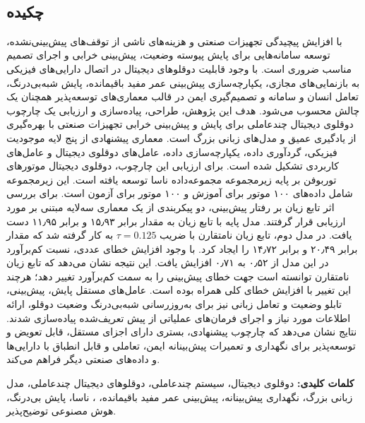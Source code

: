 
\setcounter{page}{1}
\thispagestyle{empty}

~\vfill

\subsection*{چکیده}
\begin{small}
\baselineskip=0.7cm

با افزایش پیچیدگی تجهیزات صنعتی و هزینه‌های ناشی از توقف‌های پیش‌بینی‌نشده، توسعه سامانه‌هایی برای پایش پیوسته وضعیت، پیش‌بینی خرابی و اجرای تصمیم مناسب ضروری است. با وجود قابلیت دوقلوهای دیجیتال در اتصال دارایی‌های فیزیکی به بازنمایی‌های مجازی، یکپارچه‌سازی پیش‌بینی عمر مفید باقیمانده، پایش شبه‌بی‌درنگ، تعامل انسان و سامانه و تصمیم‌گیری ایمن در قالب معماری‌های توسعه‌پذیر همچنان یک چالش محسوب می‌شود. هدف این پژوهش، طراحی، پیاده‌سازی و ارزیابی یک چارچوب دوقلوی دیجیتال چندعاملی برای پایش و پیش‌بینی خرابی تجهیزات صنعتی با بهره‌گیری از یادگیری عمیق و مدل‌های زبانی بزرگ است. معماری پیشنهادی از پنج لایه موجودیت فیزیکی، گردآوری داده، یکپارچه‌سازی داده، عامل‌های دوقلوی دیجیتال و عامل‌های کاربردی تشکیل شده است. برای ارزیابی این چارچوب، دوقلوی دیجیتال موتورهای توربوفن بر پایه زیرمجموعه  مجموعه‌داده
ناسا توسعه یافته است. این زیرمجموعه شامل داده‌های ۱۰۰ موتور برای آموزش و ۱۰۰ موتور برای آزمون است. 
برای بررسی اثر تابع زیان بر رفتار
پیش‌بینی، دو پیکربندی از یک
معماری سه‌لایه مبتنی بر
 مورد ارزیابی قرار
گرفتند. مدل پایه با تابع
زیان  به مقدار
 برابر ۱۵٫۹۳
و  برابر ۱۱٫۹۵
دست یافت. در مدل دوم،
تابع زیان نامتقارن
 با ضریب
$\tau=0.125$ به کار
گرفته شد که مقدار
 برابر ۲۰٫۴۹
و  برابر ۱۴٫۷۲
را ایجاد کرد. با وجود
افزایش خطای عددی،
نسبت کم‌برآورد در این
مدل از ۰٫۵۲ به
۰٫۷۱ افزایش یافت.
این نتیجه نشان می‌دهد
که تابع زیان نامتقارن
توانسته است جهت خطای
پیش‌بینی را به سمت
کم‌برآورد تغییر دهد؛
هرچند این تغییر با
افزایش خطای کلی همراه
بوده است.
عامل‌های مستقل پایش، پیش‌بینی، تابلو وضعیت و تعامل زبانی نیز برای به‌روزرسانی شبه‌بی‌درنگ وضعیت دوقلو، ارائه اطلاعات مورد نیاز و اجرای فرمان‌های عملیاتی از پیش‌ تعریف‌شده پیاده‌سازی شدند. نتایج نشان می‌دهد که چارچوب پیشنهادی، بستری دارای اجزای مستقل، قابل تعویض و توسعه‌پذیر برای نگهداری و تعمیرات پیش‌بینانه ایمن، تعاملی و قابل انطباق با دارایی‌ها و داده‌های صنعتی دیگر فراهم می‌کند.


\vspace*{0.7 cm}
\noindent\textbf{کلمات کلیدی:}
دوقلوی دیجیتال، سیستم چندعاملی، دوقلوهای دیجیتال چندعاملی، مدل زبانی بزرگ، نگهداری پیش‌بینانه، پیش‌بینی عمر مفید باقیمانده، 
،
ناسا،
 پایش بی‌درنگ، هوش مصنوعی توضیح‌پذیر.
\end{small}
